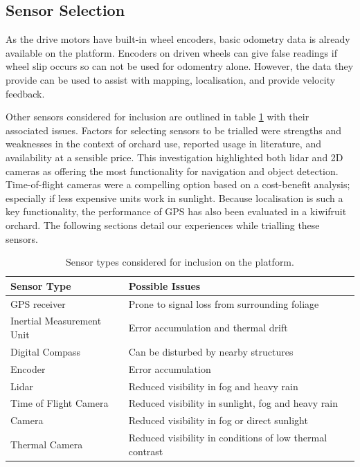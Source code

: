 \documentclass[preprint,authoryear,12pt]{elsarticle}
\begin{document}
\subsection{Sensor Selection}

    As the drive motors have built-in wheel encoders, basic odometry data is already available on the platform.
    Encoders on driven wheels can give false readings if wheel slip occurs so can not be used for odomentry alone.
    However, the data they provide can be used to assist with mapping, localisation, and provide velocity feedback.

    Other sensors considered for inclusion are outlined in table \ref{table:sensor_comparison} with their associated issues.
    Factors for selecting sensors to be trialled were strengths and weaknesses in the context of orchard use, reported usage in literature, and availability at a sensible price.
    This investigation highlighted both lidar and 2D cameras as offering the most functionality for navigation and object detection.
    Time-of-flight cameras were a compelling option based on a cost-benefit analysis; especially if less expensive units work in sunlight.
    Because localisation is such a key functionality, the performance of GPS has also been evaluated in a kiwifruit orchard.
    The following sections detail our experiences while trialling these sensors.

    \begin{table}[htbp]
        \centering
        \footnotesize
        \begin{tabular}{ l l}
            \textbf{Sensor Type}      &\textbf{Possible Issues} \\ \hline
            GPS receiver              & Prone to signal loss from surrounding foliage\\  \hline
            Inertial Measurement Unit & Error accumulation and thermal drift\\ \hline
            Digital Compass           & Can be disturbed by nearby structures\\ \hline
            Encoder                   & Error accumulation \\ \hline
            Lidar                     & Reduced visibility in fog and heavy rain \\ \hline
            Time of Flight Camera     & Reduced visibility in sunlight, fog and heavy rain \\ \hline
            Camera                    & Reduced visibility in fog or direct sunlight \\ \hline
            Thermal Camera            & Reduced visibility in conditions of low thermal contrast\\ \hline
        \end{tabular}
        \label{table:sensor_comparison}
        \caption{Sensor types considered for inclusion on the platform.}
    \end{table}
\end{document}

